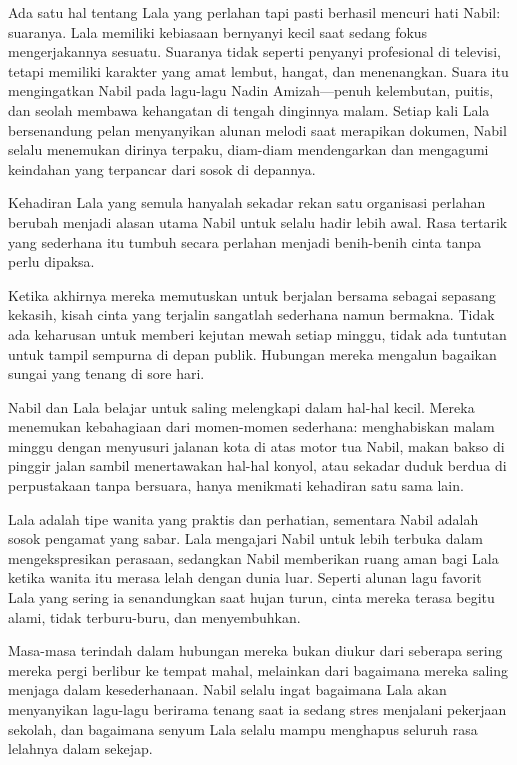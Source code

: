 Ada satu hal tentang Lala yang perlahan tapi pasti berhasil mencuri hati Nabil: suaranya. Lala memiliki kebiasaan bernyanyi kecil saat sedang fokus mengerjakannya sesuatu. Suaranya tidak seperti penyanyi profesional di televisi, tetapi memiliki karakter yang amat lembut, hangat, dan menenangkan. Suara itu mengingatkan Nabil pada lagu-lagu Nadin Amizah—penuh kelembutan, puitis, dan seolah membawa kehangatan di tengah dinginnya malam. Setiap kali Lala bersenandung pelan menyanyikan alunan melodi saat merapikan dokumen, Nabil selalu menemukan dirinya terpaku, diam-diam mendengarkan dan mengagumi keindahan yang terpancar dari sosok di depannya.

Kehadiran Lala yang semula hanyalah sekadar rekan satu organisasi perlahan berubah menjadi alasan utama Nabil untuk selalu hadir lebih awal. Rasa tertarik yang sederhana itu tumbuh secara perlahan menjadi benih-benih cinta tanpa perlu dipaksa.

Ketika akhirnya mereka memutuskan untuk berjalan bersama sebagai sepasang kekasih, kisah cinta yang terjalin sangatlah sederhana namun bermakna. Tidak ada keharusan untuk memberi kejutan mewah setiap minggu, tidak ada tuntutan untuk tampil sempurna di depan publik. Hubungan mereka mengalun bagaikan sungai yang tenang di sore hari.

Nabil dan Lala belajar untuk saling melengkapi dalam hal-hal kecil. Mereka menemukan kebahagiaan dari momen-momen sederhana: menghabiskan malam minggu dengan menyusuri jalanan kota di atas motor tua Nabil, makan bakso di pinggir jalan sambil menertawakan hal-hal konyol, atau sekadar duduk berdua di perpustakaan tanpa bersuara, hanya menikmati kehadiran satu sama lain.

Lala adalah tipe wanita yang praktis dan perhatian, sementara Nabil adalah sosok pengamat yang sabar. Lala mengajari Nabil untuk lebih terbuka dalam mengekspresikan perasaan, sedangkan Nabil memberikan ruang aman bagi Lala ketika wanita itu merasa lelah dengan dunia luar. Seperti alunan lagu favorit Lala yang sering ia senandungkan saat hujan turun, cinta mereka terasa begitu alami, tidak terburu-buru, dan menyembuhkan.

Masa-masa terindah dalam hubungan mereka bukan diukur dari seberapa sering mereka pergi berlibur ke tempat mahal, melainkan dari bagaimana mereka saling menjaga dalam kesederhanaan. Nabil selalu ingat bagaimana Lala akan menyanyikan lagu-lagu berirama tenang saat ia sedang stres menjalani pekerjaan sekolah, dan bagaimana senyum Lala selalu mampu menghapus seluruh rasa lelahnya dalam sekejap.

